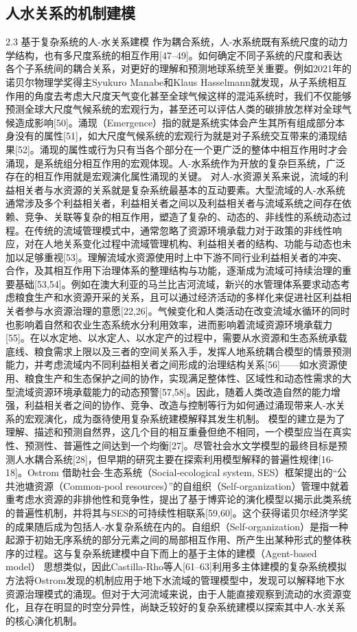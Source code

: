 \subsection{人水关系的机制建模}

2.3 基于复杂系统的人-水关系建模
作为耦合系统，人-水系统既有系统尺度的动力学结构，也有多尺度系统的相互作用[47–49]。如何确定不同子系统的尺度和表达各个子系统间的耦合关系，对更好的理解和预测地球系统至关重要。例如2021年的诺贝尔物理学奖得主Syukuro Manabe和Klaus Hasselmann就发现，从子系统相互作用的角度去考虑大尺度天气变化甚至全球气候这样的混沌系统时，我们不仅能够预测全球大尺度气候系统的宏观行为，甚至还可以评估人类的碳排放怎样对全球气候造成影响[50]。涌现（Emergence）指的就是系统实体会产生其所有组成部分本身没有的属性[51]，如大尺度气候系统的宏观行为就是对子系统交互带来的涌现结果[52]。涌现的属性或行为只有当各个部分在一个更广泛的整体中相互作用时才会涌现，是系统组分相互作用的宏观体现。人-水系统作为开放的复杂巨系统，广泛存在的相互作用就是宏观演化属性涌现的关键。
对人-水资源关系来说，流域的利益相关者与水资源的关系就是复杂系统最基本的互动要素。大型流域的人-水系统通常涉及多个利益相关者，利益相关者之间以及利益相关者与流域系统之间存在依赖、竞争、关联等复杂的相互作用，塑造了复杂的、动态的、非线性的系统动态过程。在传统的流域管理模式中，通常忽略了资源环境承载力对于政策的非线性响应，对在人地关系变化过程中流域管理机构、利益相关者的结构、功能与动态也未加以足够重视[53]。理解流域水资源使用时上中下游不同行业利益相关者的冲突、合作，及其相互作用下治理体系的整理结构与功能，逐渐成为流域可持续治理的重要基础[53,54]。例如在澳大利亚的马兰比吉河流域，新兴的水管理体系要求动态考虑粮食生产和水资源开采的关系，且可以通过经济活动的多样化来促进社区利益相关者参与水资源治理的意愿[22,26]。气候变化和人类活动在改变流域水循环的同时也影响着自然和农业生态系统水分利用效率，进而影响着流域资源环境承载力[55]。在以水定地、以水定人、以水定产的过程中，需要从水资源和生态系统承载底线、粮食需求上限以及三者的空间关系入手，发挥人地系统耦合模型的情景预测能力，并考虑流域内不同利益相关者之间形成的治理结构关系[56]——如水资源使用、粮食生产和生态保护之间的协作，实现满足整体性、区域性和动态性需求的大型流域资源环境承载能力的动态预警[57,58]。因此，随着人类改造自然的能力增强，利益相关者之间的协作、竞争、改造与控制等行为如何通过涌现带来人-水关系的宏观演化，成为亟待使用复杂系统建模解释其发生机制。
模型的建立是为了理解、描述和预测自然界，这几个目的相互重叠但绝不相同，一个模型应当在真实性、预测性、普遍性之间达到一个均衡[27]。尽管社会水文学模型的最终目标是预测人水耦合系统[28]，但早期的研究主要在探索利用模型解释的普遍性规律[16-18]。Ostrom 借助社会-生态系统（Social-ecological system, SES）框架提出的“公共池塘资源（Common-pool resources）”的自组织（Self-organization）管理中就着重考虑水资源的非排他性和竞争性，提出了基于博弈论的演化模型以揭示此类系统的普遍性机制，并将其与SES的可持续性相联系[59,60]。这个获得诺贝尔经济学奖的成果随后成为包括人-水复杂系统在内的。自组织（Self-organization）是指一种起源于初始无序系统的部分元素之间的局部相互作用、所产生出某种形式的整体秩序的过程。这与复杂系统建模中自下而上的基于主体的建模（Agent-based model） 思想类似，因此Castilla-Rho等人[61–63]利用多主体建模的复杂系统模拟方法将Ostrom发现的机制应用于地下水流域的管理模型中，发现可以解释地下水资源治理模式的涌现。但对于大河流域来说，由于人能直接观察到流动的水资源变化，且存在明显的时空分异性，尚缺乏较好的复杂系统建模以探索其中人-水关系的核心演化机制。
